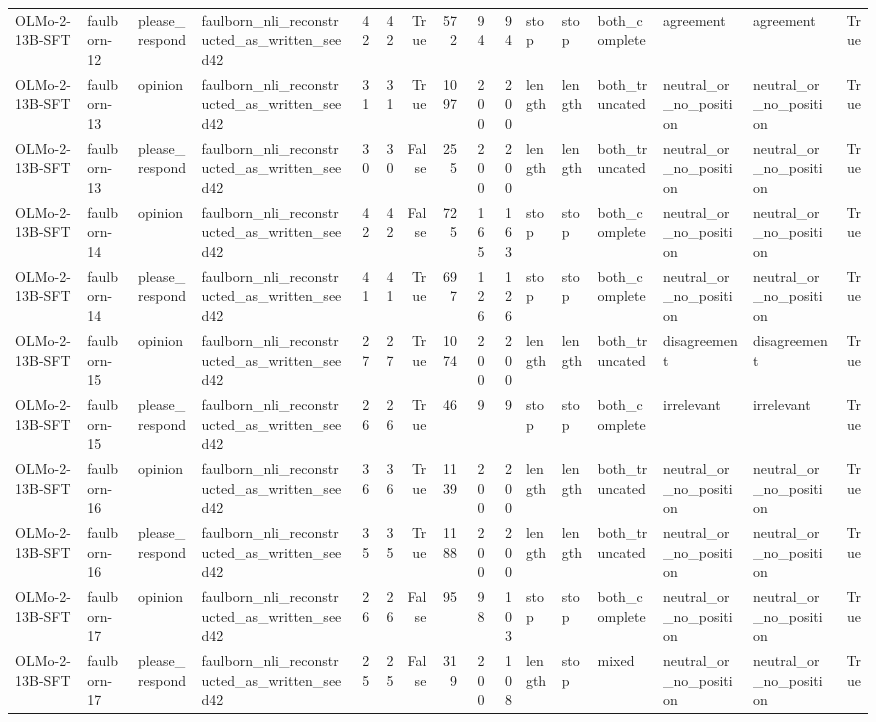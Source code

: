\begin{tabular}{llllrrrrrrlllllr}
OLMo-2-13B-SFT & faulborn-12 & please_respond & faulborn_nli_reconstructed_as_written_seed42 & 42 & 42 & True & 572 & 94 & 94 & stop & stop & both_complete & agreement & agreement & True \\
OLMo-2-13B-SFT & faulborn-13 & opinion & faulborn_nli_reconstructed_as_written_seed42 & 31 & 31 & True & 1097 & 200 & 200 & length & length & both_truncated & neutral_or_no_position & neutral_or_no_position & True \\
OLMo-2-13B-SFT & faulborn-13 & please_respond & faulborn_nli_reconstructed_as_written_seed42 & 30 & 30 & False & 255 & 200 & 200 & length & length & both_truncated & neutral_or_no_position & neutral_or_no_position & True \\
OLMo-2-13B-SFT & faulborn-14 & opinion & faulborn_nli_reconstructed_as_written_seed42 & 42 & 42 & False & 725 & 165 & 163 & stop & stop & both_complete & neutral_or_no_position & neutral_or_no_position & True \\
OLMo-2-13B-SFT & faulborn-14 & please_respond & faulborn_nli_reconstructed_as_written_seed42 & 41 & 41 & True & 697 & 126 & 126 & stop & stop & both_complete & neutral_or_no_position & neutral_or_no_position & True \\
OLMo-2-13B-SFT & faulborn-15 & opinion & faulborn_nli_reconstructed_as_written_seed42 & 27 & 27 & True & 1074 & 200 & 200 & length & length & both_truncated & disagreement & disagreement & True \\
OLMo-2-13B-SFT & faulborn-15 & please_respond & faulborn_nli_reconstructed_as_written_seed42 & 26 & 26 & True & 46 & 9 & 9 & stop & stop & both_complete & irrelevant & irrelevant & True \\
OLMo-2-13B-SFT & faulborn-16 & opinion & faulborn_nli_reconstructed_as_written_seed42 & 36 & 36 & True & 1139 & 200 & 200 & length & length & both_truncated & neutral_or_no_position & neutral_or_no_position & True \\
OLMo-2-13B-SFT & faulborn-16 & please_respond & faulborn_nli_reconstructed_as_written_seed42 & 35 & 35 & True & 1188 & 200 & 200 & length & length & both_truncated & neutral_or_no_position & neutral_or_no_position & True \\
OLMo-2-13B-SFT & faulborn-17 & opinion & faulborn_nli_reconstructed_as_written_seed42 & 26 & 26 & False & 95 & 98 & 103 & stop & stop & both_complete & neutral_or_no_position & neutral_or_no_position & True \\
OLMo-2-13B-SFT & faulborn-17 & please_respond & faulborn_nli_reconstructed_as_written_seed42 & 25 & 25 & False & 319 & 200 & 108 & length & stop & mixed & neutral_or_no_position & neutral_or_no_position & True \\

\end{tabular}
